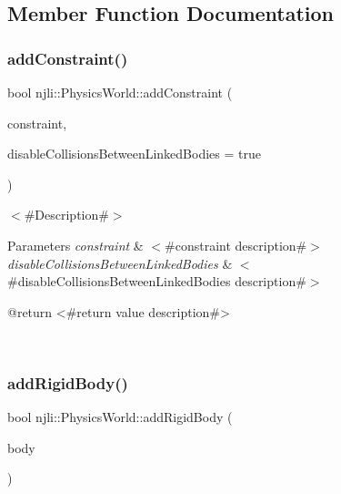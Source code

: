 \subsection{Member Function Documentation}
\mbox{\label{classnjli_1_1_physics_world_a01043c9eab9fa91adafa957ef1e57293}} 
\subsubsection{\texorpdfstring{add\+Constraint()}{addConstraint()}}
{\footnotesize\ttfamily bool njli\+::\+Physics\+World\+::add\+Constraint (\begin{DoxyParamCaption}\item[{\mbox{\hyperlink{classnjli_1_1_physics_constraint}{Physics\+Constraint}} $\ast$}]{constraint,  }\item[{bool}]{disable\+Collisions\+Between\+Linked\+Bodies = {\ttfamily true} }\end{DoxyParamCaption})}

$<$\#\+Description\#$>$


\begin{DoxyParams}{Parameters}
{\em constraint} & $<$\#constraint description\#$>$ \\
\hline
{\em disable\+Collisions\+Between\+Linked\+Bodies} & $<$\#disable\+Collisions\+Between\+Linked\+Bodies description\#$>$ \begin{DoxyVerb} @return <#return value description#>\end{DoxyVerb}
 \\
\hline
\end{DoxyParams}
\mbox{\label{classnjli_1_1_physics_world_a2fcb8da2f603c342ac9f72e33e3df9b7}} 
\subsubsection{\texorpdfstring{add\+Rigid\+Body()}{addRigidBody()}}
{\footnotesize\ttfamily bool njli\+::\+Physics\+World\+::add\+Rigid\+Body (\begin{DoxyParamCaption}\item[{\mbox{\hyperlink{classnjli_1_1_physics_body_rigid}{Physics\+Body\+Rigid}} $\ast$}]{body }\end{DoxyParamCaption})}

